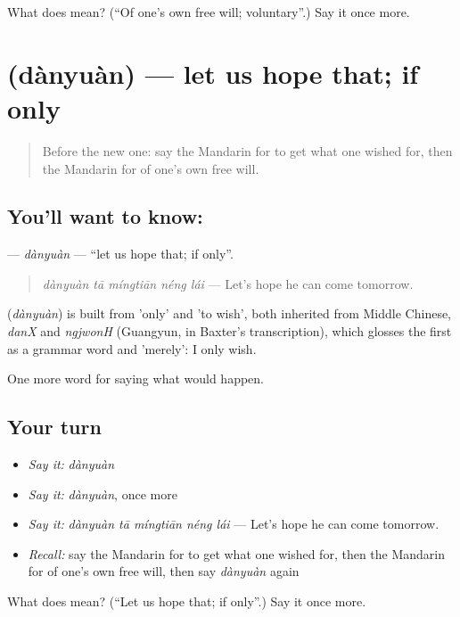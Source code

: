\begin{tcolorbox}[breakable,colback=teal!4,colframe=teal!35!black,title={Before you move on}]
What does  mean? (\textquotedblleft{}Of one's own free will; voluntary\textquotedblright{}.) Say it once more.
\end{tcolorbox}
\section[\texorpdfstring{\zh{但愿} (dànyuàn)}{但愿 (dànyuàn)}]{ (dànyuàn) — let us hope that; if only}

\label{lesson:ZH-C535-danyuan}



\begin{quote}
Before the new one: say the Mandarin for to get what one wished for, then the Mandarin for of one's own free will.
\end{quote}

\subsection*{You'll want to know: }
\textbf{} — \emph{dànyuàn} — \textquotedblleft{}let us hope that; if only\textquotedblright{}.

\begin{quote}
\textbf{} \emph{dànyuàn tā míngtiān néng lái} — Let's hope he can come tomorrow.
\end{quote}

\begin{cousinweb}
\textbf{} (\emph{dànyuàn}) is built from  'only' and  'to wish', both inherited from Middle Chinese, \emph{danX} and \emph{ngjwonH} (Guangyun, in Baxter's transcription), which glosses the first as a grammar word and 'merely': I only wish.
\end{cousinweb}

\begin{grammarlens}[title={What you've built}]
One more word for saying what would happen.
\end{grammarlens}

\subsection*{Your turn}
\begin{itemize}
\raggedright
  \item \emph{Say it:} \emph{dànyuàn}
  \item \emph{Say it:} \emph{dànyuàn}, once more
  \item \emph{Say it:} \emph{dànyuàn tā míngtiān néng lái} — Let's hope he can come tomorrow.
  \item \emph{Recall:} say the Mandarin for to get what one wished for, then the Mandarin for of one's own free will, then say \emph{dànyuàn} again
\end{itemize}

\begin{tcolorbox}[breakable,colback=teal!4,colframe=teal!35!black,title={Before you move on}]
What does  mean? (\textquotedblleft{}Let us hope that; if only\textquotedblright{}.) Say it once more.
\end{tcolorbox}
